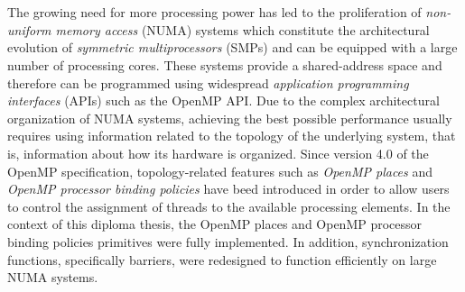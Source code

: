 \chapter*{\csebilabstract}
\addstarredchapter{\csebilabstract} %
\makecsebilabstract

\noindent The growing need for more processing power has led to the proliferation of \textit{non-uniform memory access} (NUMA) systems which constitute the architectural evolution of \textit{symmetric multiprocessors} (SMPs) and can be equipped with a large number of processing cores. These systems provide a shared-address space and therefore can be programmed %
using widespread \textit{application programming interfaces} (APIs) such as the OpenMP API. Due to the complex architectural organization of NUMA systems, achieving the best possible performance usually requires using information related to the topology of the underlying system, that is, information about how its hardware is organized. Since version 4.0 of the OpenMP specification, topology-related features such as \textit{OpenMP places} and \textit{OpenMP processor binding policies} have beed introduced in order to allow users to control the assignment of threads to the available processing elements. In the context of this diploma thesis, the OpenMP places and OpenMP processor binding policies primitives were fully implemented. In addition, synchronization functions, specifically barriers, were redesigned to function efficiently on large NUMA systems.

\bigskip
